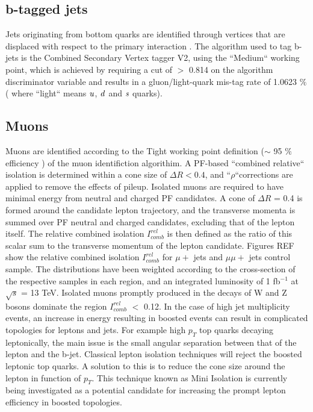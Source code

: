 \subsection{b-tagged jets}
\label{sec:btags}
Jets originating from bottom quarks are identified through vertices that are displaced with respect to the primary interaction \cite{b-tagging}. The algorithm used to tag b-jets is the Combined Secondary Vertex tagger V2, using the ``Medium`` working point, which is achieved by requiring a cut of $>$ 0.814 on the algorithm discriminator variable and results in a gluon/light-quark mis-tag rate of 1.0623 $\%$ ( where ``light`` means $\it{u}$, $\it{d}$ and $\it{s}$ quarks).



\subsection{Muons}
\label{sec:muon-id}
Muons are identified according to the Tight working point definition ($\sim$ 95 $\%$ efficiency ) of the muon identifiction algorithim. A PF-based ``combined relative`` isolation is determined within a cone size of $\Delta R < 0.4 $, and ``$\rho$``corrections are applied to remove the effects of pileup. Isolated muons are required to have minimal energy from neutral and charged PF candidates. A cone of $\Delta R$ = 0.4 is formed around the candidate lepton trajectory, and the transverse momenta is summed over PF neutral and charged candidates, excluding that of the lepton itself. The relative combined isolation $I^{rel}_{comb}$ is then defined as the ratio of this scalar sum to the transverse momentum of the lepton candidate. 
Figures REF show the relative combined isolation $I^{rel}_{comb}$ for $\mu +$ jets and $\mu\mu +$ jets control sample. The distributions have been weighted according to the cross-section of the respective samples in each region, and an integrated luminosity of 1 fb$^{-1}$ at $\sqrt{s}$ = 13 TeV. Isolated muons promptly produced in the decays of W and Z bosons dominate the region $I^{rel}_{comb}$ $<$ 0.12.
In the case of high jet multiplicity events, an increase in energy resulting in boosted events can result in complicated topologies for leptons and jets. For example high $p_{T}$ top quarks decaying leptonically, the main issue is the small angular separation between that of the lepton and the b-jet. Classical lepton isolation techniques will reject the boosted leptonic top quarks. A solution to this is to reduce the cone size around the lepton in function of $p_{T}$. This technique known as Mini Isolation is currently being investigated as a potential candidate for increasing the prompt lepton efficiency in boosted topologies.  

